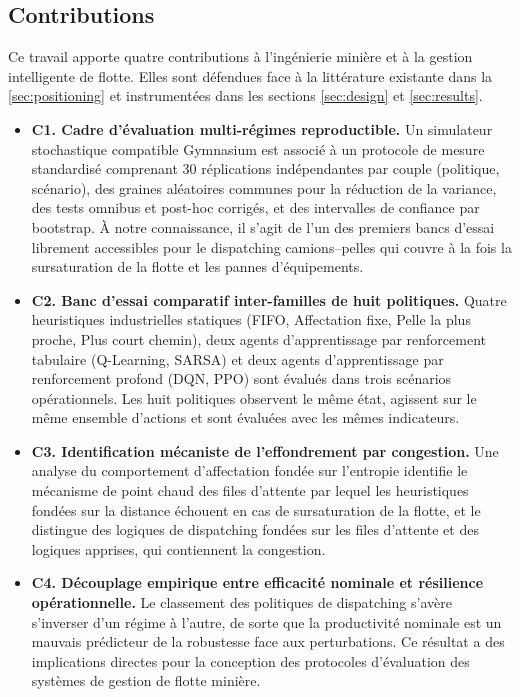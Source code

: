 \documentclass[11pt,a4paper]{article}
\begin{document}
\subsection{Contributions}
\label{sec:contributions}

Ce travail apporte quatre contributions à l'ingénierie minière et à la gestion intelligente de flotte. Elles sont défendues face à la littérature existante dans la \cref{sec:positioning} et instrumentées dans les sections \cref{sec:design} et \cref{sec:results}.

\begin{itemize}
  \item \textbf{C1. Cadre d'évaluation multi-régimes reproductible.} Un simulateur stochastique compatible Gymnasium est associé à un protocole de mesure standardisé comprenant 30 réplications indépendantes par couple (politique, scénario), des graines aléatoires communes pour la réduction de la variance, des tests omnibus et post-hoc corrigés, et des intervalles de confiance par bootstrap. À notre connaissance, il s'agit de l'un des premiers bancs d'essai librement accessibles pour le dispatching camions--pelles qui couvre à la fois la sursaturation de la flotte et les pannes d'équipements.

  \item \textbf{C2. Banc d'essai comparatif inter-familles de huit politiques.} Quatre heuristiques industrielles statiques (FIFO, Affectation fixe, Pelle la plus proche, Plus court chemin), deux agents d'apprentissage par renforcement tabulaire (Q-Learning, SARSA) et deux agents d'apprentissage par renforcement profond (DQN, PPO) sont évalués dans trois scénarios opérationnels. Les huit politiques observent le même état, agissent sur le même ensemble d'actions et sont évaluées avec les mêmes indicateurs.

  \item \textbf{C3. Identification mécaniste de l'effondrement par congestion.} Une analyse du comportement d'affectation fondée sur l'entropie identifie le mécanisme de point chaud des files d'attente par lequel les heuristiques fondées sur la distance échouent en cas de sursaturation de la flotte, et le distingue des logiques de dispatching fondées sur les files d'attente et des logiques apprises, qui contiennent la congestion.

  \item \textbf{C4. Découplage empirique entre efficacité nominale et résilience opérationnelle.} Le classement des politiques de dispatching s'avère s'inverser d'un régime à l'autre, de sorte que la productivité nominale est un mauvais prédicteur de la robustesse face aux perturbations. Ce résultat a des implications directes pour la conception des protocoles d'évaluation des systèmes de gestion de flotte minière.
\end{itemize}
\end{document}
